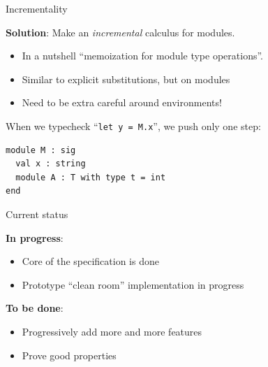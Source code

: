 \documentclass[aspectratio=169,dvipsnames,svgnames,10pt]{beamer}
\begin{document}
\begin{frame}[fragile]{Incrementality}
  
  \textbf{Solution}: Make an \emph{incremental} calculus for modules.
  \begin{itemize}
  \item In a nutshell ``memoization for module type operations''.
  \item Similar to explicit substitutions, but on modules
  \item Need to be extra careful around environments!
  \end{itemize}

  When we typecheck ``\texttt{let y = M.x}'', we push only one step:
\begin{verbatim}
module M : sig
  val x : string
  module A : T with type t = int
end
\end{verbatim}
\end{frame}

\begin{frame}{Current status}

  {\bf In progress}:
  \begin{itemize}
  \item Core of the specification is done
  \item Prototype ``clean room'' implementation in progress
  \end{itemize}

  {\bf To be done}:
  \begin{itemize}
  \item Progressively add more and more features
  \item Prove good properties
  \end{itemize}
\end{frame}
\end{document}
